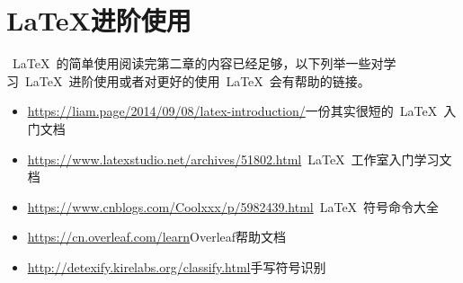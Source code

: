 \section{\LaTeX 进阶使用}
~\LaTeX~的简单使用阅读完第二章的内容已经足够，以下列举一些对学习~\LaTeX~进阶使用或者对更好的使用~\LaTeX~会有帮助的链接。
\begin{itemize}
\item \href{https://liam.page/2014/09/08/latex-introduction/}{https://liam.page/2014/09/08/latex-introduction/}{一份其实很短的~\LaTeX~入门文档}

\item \href{https://www.latexstudio.net/archives/51802.html}{https://www.latexstudio.net/archives/51802.html}{~\LaTeX~工作室入门学习文档}

\item \href{https://www.cnblogs.com/Coolxxx/p/5982439.html}{https://www.cnblogs.com/Coolxxx/p/5982439.html}{~\LaTeX~符号命令大全}

\item \href{https://cn.overleaf.com/learn}{https://cn.overleaf.com/learn}{Overleaf帮助文档}

\item \href{http://detexify.kirelabs.org/classify.html}{http://detexify.kirelabs.org/classify.html}{手写符号识别}

\end{itemize}

